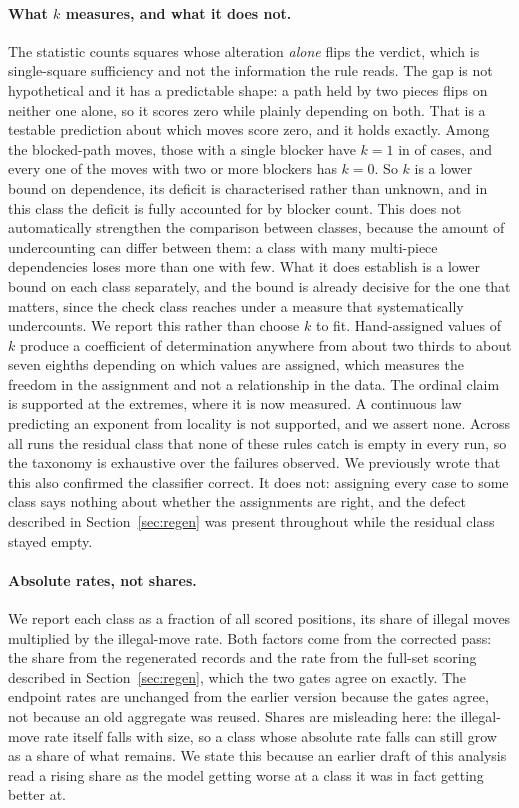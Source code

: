 \documentclass[11pt]{article}
\begin{document}
\paragraph{What $k$ measures, and what it does not.}
The statistic counts squares whose alteration \emph{alone} flips the verdict, which is
single-square sufficiency and not the information the rule reads. The gap is not
hypothetical and it has a predictable shape: a path held by two pieces flips on
neither one alone, so it scores zero while plainly depending on both. That is a
testable prediction about which moves score zero, and it holds exactly. Among the
 blocked-path moves, those with a single blocker have $k=1$ in  of
 cases, and every one of the  moves with two or more blockers has
$k=0$. So $k$ is a lower bound on dependence, its deficit is characterised rather
than unknown, and in this class the deficit is fully accounted for by blocker count.
This does not automatically strengthen the comparison between classes, because the
amount of undercounting can differ between them: a class with many multi-piece
dependencies loses more than one with few. What it does establish is a lower bound on
each class separately, and the bound is already decisive for the one that matters,
since the check class reaches
 under a measure that systematically undercounts.
We report this rather than choose $k$ to fit. Hand-assigned values of $k$ produce a
coefficient of determination anywhere from about two thirds to about seven eighths
depending on which values are assigned, which measures the freedom in the assignment
and not a relationship in the data. The ordinal claim is supported at the extremes,
where it is now measured. A continuous law predicting an exponent from locality is
not supported, and we assert none.
Across all  runs the residual class that none of these rules catch
is empty in every run, so the taxonomy is exhaustive over the
failures observed. We previously wrote that this also confirmed the classifier
correct. It does not: assigning every case to some class says nothing about whether
the assignments are right, and the defect described in Section~\ref{sec:regen} was
present throughout while the residual class stayed empty.

\paragraph{Absolute rates, not shares.}
We report each class as a fraction of all scored positions, its share of illegal
moves multiplied by the illegal-move rate. Both factors come from the corrected pass:
the share from the regenerated records and the rate from the full-set scoring
described in Section~\ref{sec:regen}, which the two gates agree on exactly. The
endpoint rates are unchanged from the earlier version because the gates agree, not
because an old aggregate was reused. Shares are misleading here: the
illegal-move rate itself falls with size, so a class whose absolute rate falls can
still grow as a share of what remains. We state this because an earlier draft of
this analysis read a rising share as the model getting worse at a class it was in
fact getting better at.
\end{document}
